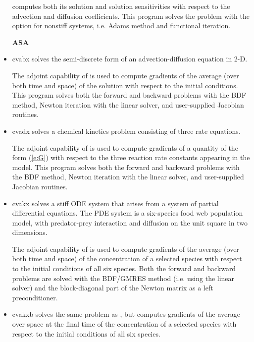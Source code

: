 \begin{itemize}
  {\cvodes} computes both its solution and solution sensitivities with respect
  to the advection and diffusion coefficients.
  This program solves the problem with the option for nonstiff systems,
  i.e. Adams method and functional iteration.

\item[{\bf ASA}]

\item{cvabx}
  solves the semi-discrete form of an advection-diffusion equation in 2-D.

  The adjoint capability of {\cvodes} is used to compute gradients
  of the average (over both time and space) of the solution with respect to
  the initial conditions.
  This program solves both the forward and backward problems with the BDF method, 
  Newton iteration with the {\cvband} linear solver, and user-supplied     
  Jacobian routines.

\item{cvadx}
  solves a chemical kinetics problem consisting of three rate equations.
  
  The adjoint capability of {\cvodes} is used to compute gradients
  of a quantity of the form (\ref{e:G}) with respect to the three
  reaction rate constants appearing in the model.
  This program solves both the forward and backward problems with the BDF method, 
  Newton iteration with the {\cvdense} linear solver, and user-supplied    
  Jacobian routines.

\item{cvakx}
  solves a stiff ODE system that arises from a system     
  of partial differential equations.  The PDE system is a six-species
  food web population model, with predator-prey interaction and diffusion 
  on the unit square in two dimensions.

  The adjoint capability of {\cvodes} is used to compute gradients
  of the average (over both time and space) of the concentration of a selected species
  with respect to the initial conditions of all six species.
  Both the forward and backward problems are solved with the BDF/GMRES method 
  (i.e. using the {\cvspgmr} linear solver) and the block-diagonal part of the  
  Newton matrix as a left preconditioner.

\item{cvakxb}
  solves the same problem as , but computes gradients
  of the average over space at the final time of the concentration of a selected species
  with respect to the initial conditions of all six species.

\end{itemize}


